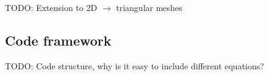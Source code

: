 TODO: Extension to 2D $\rightarrow$ triangular meshes

\subsection{Code framework}

TODO: Code structure, why is it easy to include different equations?
